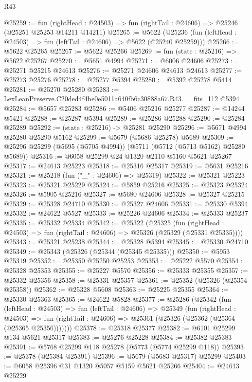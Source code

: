 \begin{lexlean}{R43}
\begin{coremodule}
@25259 := fun (rightHead : @24503) =>
  fun (rightTail : @24606) => @25246 (@25251 @25253 @14211 @14211)
@25265 := @5622
    (@25236 (fun (leftHead : @24503) => fun (leftTail : @24606) => @5622 (@25240 @25259)))
@25266 := @5622 @25265
@25267 := @5622 @25266
@25269 := fun (state : @25216) => @5622 @25267
@25270 := @5651 @4994
@25271 := @6006 @24606
@25273 := @25271 @25215 @24613
@25276 := @25271 @24606 @24613 @24613
@25277 := @25273 @25276
@25278 := @25277 @5394
@25280 := @5392 @25278 @5414
@25281 := @25270 @25280
@25283 := LexLeanPreserve.C20ded4f4be0e5011a640fb6c30888a67.R43.__fits_112 @5394
@25284 := @5657 @25283
@25286 := @5406 @25216 @25277
@25287 := @14244 @5421
@25288 := @25287 @5394
@25289 := @25286 @25288
@25290 := @25284 @25289
@25292 := (state : @25216) -> @25281 @25290
@25296 := @5671 @4994 @25280 @25290 @5162
@25299 := @5679 (@5686 @25278) @5689
@25309 := @25296 @25299 (@5695 (@5705 @4994)) (@5711 (@5712 (@5713 @5162) @25280 @5689))
@25316 := @6058 @25299 @24 @1320 @2110 @5160 @5621 @25267
@25317 := @24613 @25223
@25318 := @25316 @25317
@25319 := @5631 @25216
@25321 := @25218 (fun ("_" : @24606) => @25319)
@25322 := @25321 @25223
@25323 := @25321 @25229
@25324 := @5859 @25216
@25325 := @25323 @25324
@25326 := @5905 @25216
@25327 := @5680 @24606
@25328 := @25327 @25215
@25329 := @25328 @24710
@25330 := @25327 @24606
@25331 := @25330 @5394
@25332 := @24622 @5527
@25333 := @25226 @24606
@25334 := @25333 @25237
@25335 := @25332 @25334
@25342 := @25322
    (@25325
      (fun (rightHead : @24503) => fun (rightTail : @24606) => @25326 (@25329 (@25331 @25335))))
@25343 := @25321 @25238
@25344 := @25328 @5394
@25345 := @25330 @24710
@25349 := @25343 (@25326 (@25344 (@25345 @25335)))
@25350 := @5953 @25319
@25352 := @25350 @25250 @25253
@25353 := @25222 @5570
@25354 := @25328 @25353
@25355 := @25227 @5570
@25356 := @25333 @25355
@25357 := @25332 @25356
@25358 := @25331 @25357
@25361 := @25352 (@25326 (@25354 @25358))
@25362 := @25328 @5608
@25363 := @25225 @25355
@25364 := @25330 @25363
@25365 := @24622 @5828
@25377 := @25286
    (@25342
      (fun (leftHead : @24503) =>
      fun (leftTail : @24606) =>
      @25349
        (fun (rightHead : @24503) =>
        fun (rightTail : @24606) => @25361 (@25326 (@25362 (@25364 (@25365 @25356)))))))
@25378 := @25318 @25377
@25382 := @6101 @25299 @134 @5621 @25317
@25383 := @25276 @25228
@25384 := @25382 @25383
@25391 := @5768 @25299 @118 @25278 (@5773 (@5774 @25299 @118))
@25393 := @25378 (@25384 @25391)
@25396 := @5679 (@5683 @25317) @25299
@25403 := @6058 @25396 @31 @1320 @5057 @5159 @5621 @25266
@25404 := @24613 @25229

\end{coremodule}
\end{lexlean}
